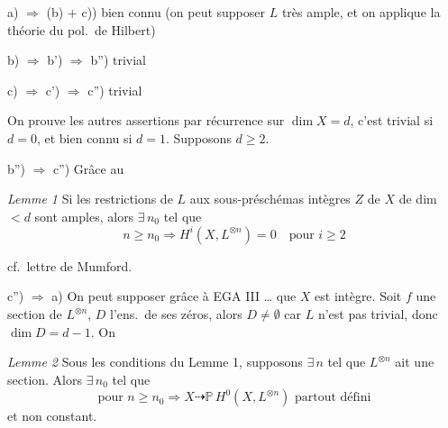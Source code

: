 \documentclass[11pt,a4paper]{article}
\begin{document}

a) $\Longrightarrow$ (b) $+$ c)) bien connu (on peut supposer $L$ très ample,
et on applique la théorie du pol.\ de Hilbert)

b) $\Longrightarrow$ b') $\Longrightarrow$ b'') trivial

c) $\Longrightarrow$ c') $\Longrightarrow$ c'') trivial

On prouve les autres assertions par récurrence sur \struck{\ill{}}
$\dim X = d$, c'est trivial si $d = 0$, et bien connu si $d = 1$. Supposons
$d \geqslant 2$.

b'') $\Longrightarrow$ c'') Grâce au

\emph{Lemme 1} Si les 
restrictions de $L$ aux sous-préschémas intègres $Z$ de $X$ de dim $< d$ sont
amples, alors $\exists\, n_{0}$ tel que
\[
  n \geqslant n_{0} \Longrightarrow H^{i}(X, L^{\otimes n}) = 0 \quad
  \text{pour } i \geqslant 2
\]
\struck{\ill{}}

cf.\ lettre de Mumford.


c'') $\Longrightarrow$ a) On peut supposer grâce à EGA III … que $X$ est
intègre. \struck{\ill{}} Soit $f$ une section de $L^{\otimes n}$,
\struck{\ill{}} $D$ l'ens.\ de ses zéros, alors $D \neq \emptyset$ car $L$
n'est pas trivial, donc $\dim D = d - 1$. On  \ill{}

\emph{Lemme 2} Sous les conditions du Lemme 1, supposons $\exists\, n$ tel
que $L^{\otimes n}$ ait une section. Alors $\exists\, n_{0}$ tel que
\[
  \text{pour } n \geqslant n_{0} \Longrightarrow X \dashrightarrow
  \mathbb{P}\, H^{0}(X, L^{\otimes n}) \text{ partout défini}
\]
et non constant.
\end{document}
